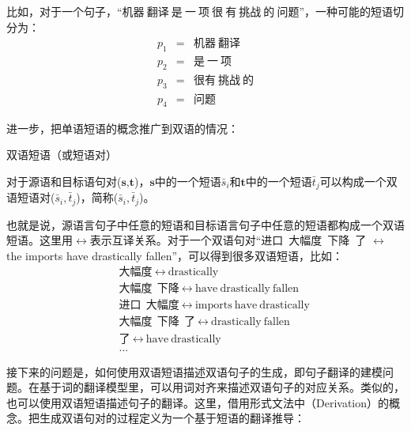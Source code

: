\parinterval 比如，对于一个句子，``$\text{机器}\ \text{翻译}\ \text{是}\ \text{一}\ \text{项}\ \text{很}\ \text{有}\ \text{挑战}\ \text{的}\ \text{问题}$''，一种可能的短语切分为：
\begin{eqnarray}
p_1 &=& \text{机器}\ \text{翻译} \nonumber \\
p_2 &=& \text{是}\ \text{一}\ \text{项} \nonumber \\
p_3 &=& \text{很有}\ \text{挑战}\ \text{的} \nonumber \\
p_4 &=& \text{问题}\nonumber
\end{eqnarray}

\parinterval 进一步，把单语短语的概念推广到双语的情况：

\vspace{0.5em}
\begin{definition} 双语短语（或短语对）

{\small
对于源语和目标语句对($\mathbf{s}$,$\mathbf{t}$)，$\mathbf{s}$中的一个短语$\bar{s}_i$和$\mathbf{t}$中的一个短语$\bar{t}_j$可以构成一个双语短语对($\bar{s}_i,\bar{t}_j$)，简称{\small{}}($\bar{s}_i,\bar{t}_j$)。
}
\end{definition}

\parinterval 也就是说，源语言句子中任意的短语和目标语言句子中任意的短语都构成一个双语短语。这里用$\leftrightarrow$表示互译关系。对于一个双语句对``进口\ 大幅度\ 下降\ 了 $\leftrightarrow$ the imports have drastically fallen''，可以得到很多双语短语，比如：
\begin{eqnarray}
&&\text{大幅度}\ \leftrightarrow\ \textrm{drastically} \nonumber \\
&&\text{大幅度}\ \ \text{下降}\ \leftrightarrow\ \textrm{have}\ \textrm{drastically}\ \textrm{fallen} \nonumber \\
&&\text{进口}\ \ \text{大幅度}\ \leftrightarrow\ \textrm{imports}\ \textrm{have}\ \textrm{drastically} \nonumber \\
&&\text{大幅度}\ \ \text{下降}\ \ \text{了}\ \leftrightarrow\ \textrm{drastically}\ \textrm{fallen} \nonumber \\
&&\text{了}\ \leftrightarrow\ \textrm{have}\ \textrm{drastically} \nonumber \\
&&... \nonumber
\end{eqnarray}

\parinterval 接下来的问题是，如何使用双语短语描述双语句子的生成，即句子翻译的建模问题。在基于词的翻译模型里，可以用词对齐来描述双语句子的对应关系。类似的，也可以使用双语短语描述句子的翻译。这里，借用形式文法中{\small{}}（Derivation）的概念。把生成双语句对的过程定义为一个基于短语的翻译推导：

